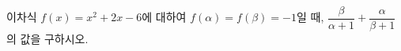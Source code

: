 이차식 $f(x)=x^2+2x-6$에 대하여 $f(\alpha)=f(\beta)=-1$일 때, $\dfrac{\beta}{\alpha+1}+\dfrac{\alpha}{\beta+1}$의 값을 구하시오.
